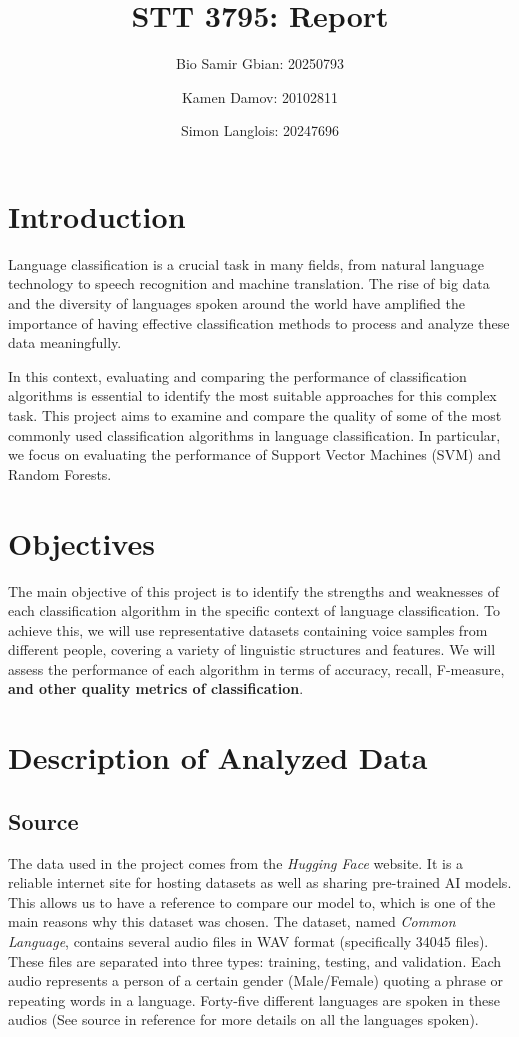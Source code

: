 \documentclass[twocolumn]{article}
\title{STT 3795: Report}
\author{Bio Samir Gbian: 20250793}
\author{Kamen Damov: 20102811}
\author{Simon Langlois: 20247696}
\affil{Department of Mathematics and Statistics}
\affil{University of Montreal}
\begin{document}
\maketitle

\section{Introduction}
Language classification is a crucial task in many fields, from natural language technology to speech recognition and machine translation. The rise of big data and the diversity of languages spoken around the world have amplified the importance of having effective classification methods to process and analyze these data meaningfully.

In this context, evaluating and comparing the performance of classification algorithms is essential to identify the most suitable approaches for this complex task. This project aims to examine and compare the quality of some of the most commonly used classification algorithms in language classification. In particular, we focus on evaluating the performance of Support Vector Machines (SVM) and Random Forests.

\section{Objectives}
The main objective of this project is to identify the strengths and weaknesses of each classification algorithm in the specific context of language classification. To achieve this, we will use representative datasets containing voice samples from different people, covering a variety of linguistic structures and features. We will assess the performance of each algorithm in terms of accuracy, recall, F-measure, \textbf{and other quality metrics of classification}.

\section{Description of Analyzed Data}
\subsection{Source}
The data used in the project comes from the \textit{Hugging Face} website. It is a reliable internet site for hosting datasets as well as sharing pre-trained AI models. This allows us to have a reference to compare our model to, which is one of the main reasons why this dataset was chosen.
The dataset, named \textit{Common Language}, contains several audio files in WAV format (specifically 34045 files). These files are separated into three types: training, testing, and validation. Each audio represents a person of a certain gender (Male/Female) quoting a phrase or repeating words in a language. Forty-five different languages are spoken in these audios (See source in reference for more details on all the languages spoken).
\end{document}
